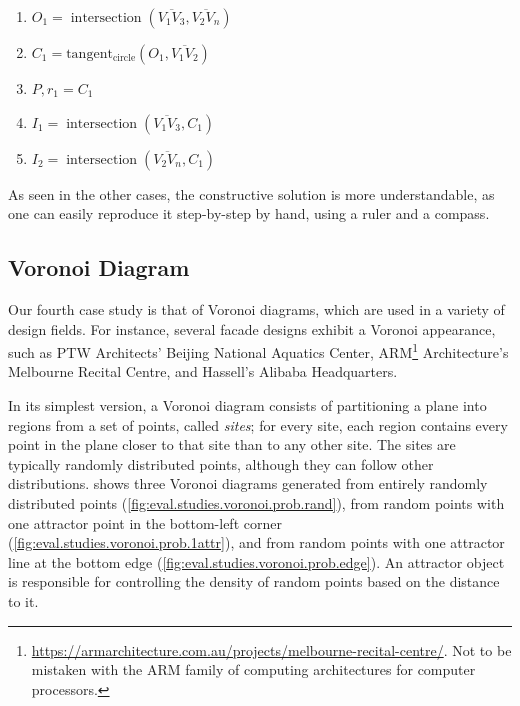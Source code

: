 \begin{enumerate}
  \item $O_1 = \operatorname{intersection}\left(\overline{V_1 V_3},
  \overline{V_2 V_n}\right)$
  \item $C_1 = \operatorname{tangent_{circle}}\left(O_1, \overline{V_1
  V_2}\right)$
  \item $P,r_1 = C_1$
  \item $I_1 = \operatorname{intersection}\left(\overline{V_1 V_3}, C_1\right)$
  \item $I_2 = \operatorname{intersection}\left(\overline{V_2 V_n}, C_1\right)$
\end{enumerate}

As seen in the other cases, the constructive solution is more understandable, as
one can easily reproduce it step-by-step by hand, using a ruler and a compass.

\subsection{Voronoi Diagram}%
\label{sec:eval.studies.voronoi}

Our fourth case study is that of Voronoi diagrams, which are used in a variety
of design fields.  For instance, several facade designs exhibit a Voronoi
appearance, such as PTW Architects' Beijing National Aquatics Center,
ARM\footnote{\url{https://armarchitecture.com.au/projects/melbourne-recital-centre/}.
Not to be mistaken with the ARM family of computing architectures for computer
processors.} Architecture's Melbourne Recital Centre, and Hassell's Alibaba
Headquarters.

In its simplest version, a Voronoi diagram consists of partitioning a plane into
regions from a set of points, called \textit{sites}; for every site, each region
contains every point in the plane closer to that site than to any other site.
The sites are typically randomly distributed points, although they can follow
other distributions.   shows three Voronoi
diagrams generated from entirely randomly distributed points
(\cref{fig:eval.studies.voronoi.prob.rand}), from random points with one
attractor point in the bottom-left corner
(\cref{fig:eval.studies.voronoi.prob.1attr}), and from random points with one
attractor line at the bottom edge (\cref{fig:eval.studies.voronoi.prob.edge}).
An attractor object is responsible for controlling the density of random points
based on the distance to it.

